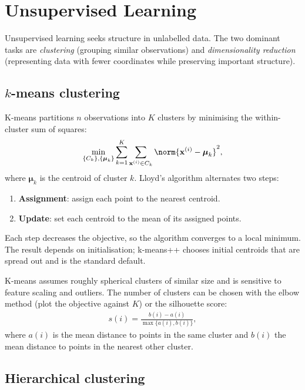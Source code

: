 \documentclass[a4paper, 12pt]{book}
\begin{document}

\chapter{Unsupervised Learning}
\label{ch:unsupervised}

Unsupervised learning seeks structure in unlabelled data. The two dominant tasks are
\emph{clustering} (grouping similar observations) and \emph{dimensionality reduction}
(representing data with fewer coordinates while preserving important structure).

\section{\texorpdfstring{$k$}{k}-means clustering}

K-means partitions $n$ observations into $K$ clusters by minimising the within-cluster
sum of squares:
\begin{align}
    \min_{\{C_k\},\{\boldsymbol{\mu}_k\}}
    \sum_{k=1}^K \sum_{\mathbf{x}^{(i)} \in C_k}
    \norm{\mathbf{x}^{(i)} - \boldsymbol{\mu}_k}^2,
\end{align}
where $\boldsymbol{\mu}_k$ is the centroid of cluster $k$. Lloyd's algorithm
alternates two steps:
\begin{enumerate}
    \item \textbf{Assignment}: assign each point to the nearest centroid.
    \item \textbf{Update}: set each centroid to the mean of its assigned points.
\end{enumerate}
Each step decreases the objective, so the algorithm converges to a local minimum. The
result depends on initialisation; k-means++ chooses initial centroids that are spread
out and is the standard default.

K-means assumes roughly spherical clusters of similar size and is sensitive to
feature scaling and outliers. The number of clusters can be chosen with the elbow
method (plot the objective against $K$) or the silhouette score:
\begin{align}
    s(i) = \frac{b(i)-a(i)}{\max\{a(i),b(i)\}},
\end{align}
where $a(i)$ is the mean distance to points in the same cluster and $b(i)$ the mean
distance to points in the nearest other cluster.

\section{Hierarchical clustering}
\end{document}
